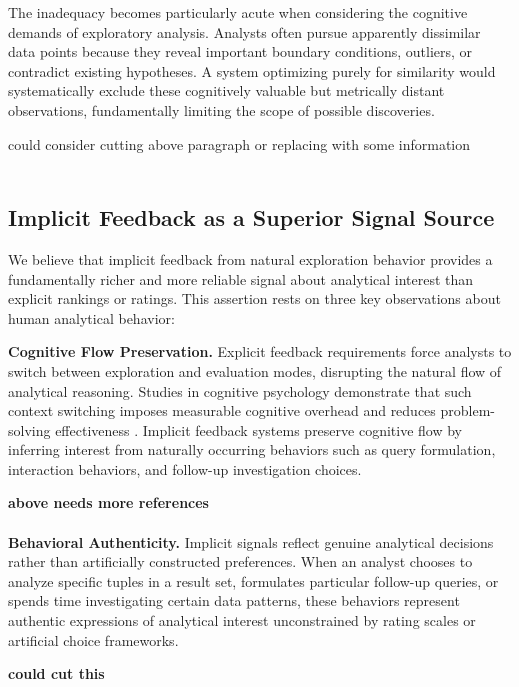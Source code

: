 \documentclass[sigconf, nonacm]{acmart}
\begin{document}
The inadequacy becomes particularly acute when considering the cognitive demands of exploratory analysis. Analysts often pursue apparently dissimilar data points because they reveal important boundary conditions, outliers, or contradict existing hypotheses. A system optimizing purely for similarity would systematically exclude these cognitively valuable but metrically distant observations, fundamentally limiting the scope of possible discoveries.

could consider cutting above paragraph or replacing with some information \\\\

\subsection{Implicit Feedback as a Superior Signal Source}

We believe that implicit feedback from natural exploration behavior provides a fundamentally richer and more reliable signal about analytical interest than explicit rankings or ratings. This assertion rests on three key observations about human analytical behavior:

\textbf{Cognitive Flow Preservation.} Explicit feedback requirements force analysts to switch between exploration and evaluation modes, disrupting the natural flow of analytical reasoning. Studies in cognitive psychology demonstrate that such context switching imposes measurable cognitive overhead and reduces problem-solving effectiveness \cite{monsell2003task}. Implicit feedback systems preserve cognitive flow by inferring interest from naturally occurring behaviors such as query formulation, interaction behaviors, and follow-up investigation choices.

\textbf{above needs more references} \\ \\

\textbf{Behavioral Authenticity.} Implicit signals reflect genuine analytical decisions rather than artificially constructed preferences. When an analyst chooses to analyze specific tuples in a result set, formulates particular follow-up queries, or spends time investigating certain data patterns, these behaviors represent authentic expressions of analytical interest unconstrained by rating scales or artificial choice frameworks.

\textbf{ could cut this } \\\\
\end{document}
